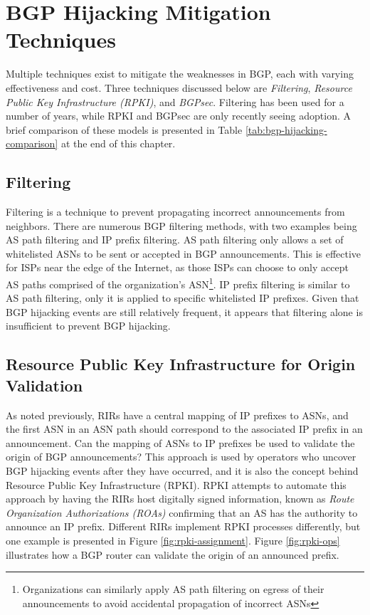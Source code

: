 \documentclass[conference]{IEEEtran}
\begin{document}
\section{BGP Hijacking Mitigation Techniques}
Multiple techniques exist to mitigate the weaknesses in BGP, each with varying effectiveness and cost.  Three techniques discussed below are \emph{Filtering}, \emph{Resource Public Key Infrastructure (RPKI)}, and \emph{BGPsec}.  Filtering has been used for a number of years, while RPKI and BGPsec are only recently seeing adoption.  A brief comparison of these models is presented in Table \ref{tab:bgp-hijacking-comparison} at the end of this chapter.

\subsection{Filtering}
Filtering is a technique to prevent propagating incorrect announcements from neighbors.  There are numerous BGP filtering methods, with two examples being AS path filtering and IP prefix filtering.  AS path filtering only allows a set of whitelisted ASNs to be sent or accepted in BGP announcements.  This is effective for ISPs near the edge of the Internet, as those ISPs can choose to only accept AS paths comprised of the organization's ASN\footnote{Organizations can similarly apply AS path filtering on egress of their announcements to avoid accidental propagation of incorrect ASNs}.  IP prefix filtering is similar to AS path filtering, only it is applied to specific whitelisted IP prefixes.  Given that BGP hijacking events are still relatively frequent, it appears that filtering alone is insufficient to prevent BGP hijacking.

\subsection{Resource Public Key Infrastructure for Origin Validation}
As noted previously, RIRs have a central mapping of IP prefixes to ASNs, and the first ASN in an ASN path should correspond to the associated IP prefix in an announcement.  Can the mapping of ASNs to IP prefixes be used to validate the origin of BGP announcements?  This approach is used by operators who uncover BGP hijacking events after they have occurred, and it is also the concept behind Resource Public Key Infrastructure (RPKI).  RPKI attempts to automate this approach by having the RIRs host digitally signed information, known as \emph{Route Organization Authorizations (ROAs)} confirming that an AS has the authority to announce an IP prefix.  Different RIRs implement RPKI processes differently, but one example is presented in Figure \ref{fig:rpki-assignment}.  Figure \ref{fig:rpki-ops} illustrates how a BGP router can validate the origin of an announced prefix.
\end{document}
